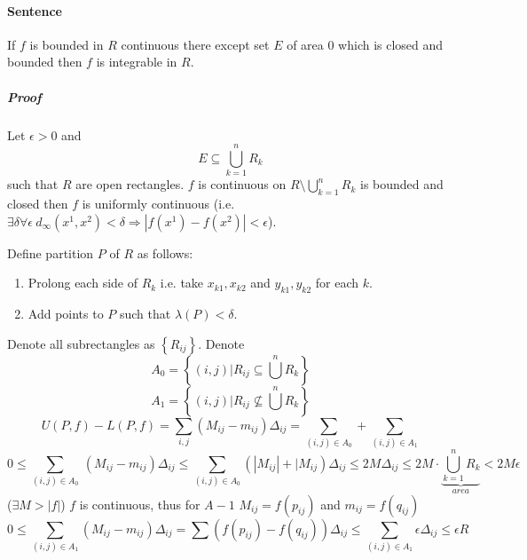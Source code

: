 \paragraph{Sentence} If $f$ is bounded in $R$ continuous there except set $E$ of area 0 which is closed and bounded then $f$ is integrable in $R$.
\subparagraph{Proof}
Let $\epsilon > 0$ and
$$E \subseteq \bigcup_{k=1}^{n} R_k$$
such that $R$ are open rectangles.
$f$ is continuous on $R \setminus \bigcup_{k=1}^{n} R_k$ is bounded and closed then $f$ is uniformly continuous (i.e. $\exists \delta \forall \epsilon \: d_{\infty}(x^1, x^2) < \delta \Rightarrow |f(x^1) - f(x^2)| < \epsilon$).

Define partition $P$ of $R$ as follows:
\begin{enumerate}
	\item Prolong each side of $R_k$ i.e. take $x_{k1}, x_{k2}$ and $y_{k1}, y_{k2}$ for each $k$.
	\item Add points to $P$ such that $\lambda(P) < \delta$.
\end{enumerate}

Denote all subrectangles as $\left\{ R_{ij} \right\}$.
Denote 
$$A_0 = \left\{ (i,j) | R_{ij} \subseteq \bigcup^n R_k \right\}$$
$$A_1 = \left\{ (i,j) | R_{ij} \not\subseteq \bigcup^n R_k \right\}$$
$$U(P,f) - L(P,f) = \sum_{i,j} (M_{ij} - m_{ij})\Delta_{ij} = \sum_{(i,j) \in A_0} + \sum_{(i,j) \in A_1}$$
$$0 \leq \sum_{(i,j) \in A_0} \: (M_{ij} - m_{ij}) \Delta_{ij} \leq \sum_{(i,j) \in A_0} (|M_{ij}| + |M_{ij}) \Delta_{ij} \leq 2M\Delta_{ij} \leq 2M \cdot \underbrace{\bigcup_{k=1}^n R_k}_{area} < 2M\epsilon$$
($\exists M > |f|$)
$f$ is continuous, thus for $A-1$ $M_{ij} = f(p_{ij})$ and $m_{ij} = f(q_{ij})$ 
$$0 \leq \sum_{(i,j) \in A_1} (M_{ij} - m_{ij}) \Delta_{ij} = \sum \left(f(p_{ij}) -f(q_{ij})\right)\Delta_{ij} \leq \sum_{(i,j) \in A_1} \epsilon \Delta_{ij} \leq \epsilon R$$
